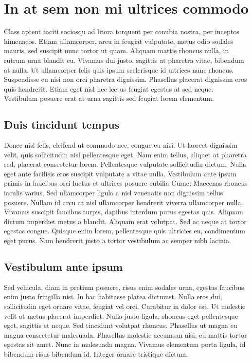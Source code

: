 \section{In at sem non mi ultrices commodo}

 Class aptent taciti sociosqu ad litora torquent per conubia nostra, per inceptos himenaeos. Etiam ullamcorper, arcu in feugiat vulputate, metus odio sodales mauris, sed suscipit nunc tortor ut quam. Aliquam mattis rhoncus nulla, in rutrum urna blandit eu. Vivamus dui justo, sagittis at pharetra vitae, bibendum at nulla. Ut ullamcorper felis quis ipsum scelerisque id ultrices nunc rhoncus. Suspendisse eu nisi non orci pharetra dignissim. Phasellus placerat dignissim eros quis hendrerit. Etiam eget nisl nec lectus feugiat egestas at sed neque. Vestibulum posuere erat at urna sagittis sed feugiat lorem elementum.


\subsection{Duis tincidunt tempus}

Donec nisl felis, eleifend ut commodo nec, congue eu nisi. Ut laoreet dignissim velit, quis sollicitudin nisl pellentesque eget. Nam enim tellus, aliquet at pharetra sed, placerat consectetur lorem. Pellentesque vulputate sollicitudin dictum. Nulla eget ante facilisis eros suscipit vulputate a vitae nulla. Vestibulum ante ipsum primis in faucibus orci luctus et ultrices posuere cubilia Curae; Maecenas rhoncus iaculis varius. Sed ullamcorper ligula a nisl venenatis non dignissim tellus posuere. Nullam id arcu at nisl ullamcorper hendrerit viverra ullamcorper nulla. Vivamus suscipit faucibus turpis, dapibus interdum purus egestas quis. Aliquam dictum imperdiet metus a blandit. Aliquam erat volutpat. Sed ac neque at tortor egestas congue. Quisque enim lorem, pellentesque quis ultricies eu, condimentum eget purus. Nam hendrerit justo a tortor vestibulum ac semper nibh lacinia. 

\subsection{Vestibulum ante ipsum}

Sed vehicula, diam in pretium posuere, risus enim sodales urna, egestas faucibus enim justo fringilla nisi. In hac habitasse platea dictumst. Nulla eros dui, sollicitudin eget ornare vitae, feugiat vel orci. Curabitur in dolor est. Ut molestie velit at metus placerat imperdiet. Nulla justo ligula, rhoncus eget pellentesque eget, sagittis et neque. Sed tincidunt volutpat rhoncus. Phasellus ut magna eu magna consectetur malesuada. Phasellus molestie accumsan nisi, eu mattis tortor egestas sit amet. Nunc in malesuada magna. Vivamus elementum porta ligula, id bibendum risus bibendum id. Integer ornare tristique dictum. 

